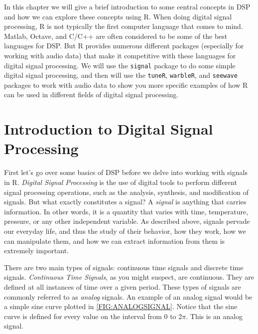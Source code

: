 \documentclass[12pt,oneside]{book}\usepackage[]{graphicx}\usepackage[]{color}
\begin{document}
{{{{In this chapter we will give a brief introduction to some central concepts in DSP and how we can explore these concepts using R. When doing digital signal processing, R is not typically the first computer language that comes to mind. Matlab, Octave, and C/C++ are often considered to be some of the best languages for DSP. But R provides numerous different packages (especially for working with audio data) that make it competitive with these languages for digital signal processing. We will use the \verb+signal+ package to do some simple digital signal processing, and then will use the \verb+tuneR+, \verb+warbleR+, and \verb+seewave+ packages to work with audio data to show you more specific examples of how R can be used in different fields of digital signal processing. 

\section{Introduction to Digital Signal Processing}

First let's go over some basics of DSP before we delve into working with signals in R. \emph{Digital Signal Processing} is the use of digital tools to perform different signal processing operations, such as the analysis, synthesis, and modification of signals. But what exactly constitutes a signal? A \emph{signal} is anything that carries information. In other words, it is a quantity that varies with time, temperature, pressure, or any other independent variable. As described above, signals pervade our everyday life, and thus the study of their behavior, how they work, how we can manipulate them, and how we can extract information from them is extremely important. 

There are two main types of signals: continuous time signals and discrete time signals. \emph{Continuous Time Signals}, as you might suspect, are continuous. They are defined at all instances of time over a given period. These types of signals are commonly referred to as \emph{analog} signals. An example of an analog signal would be a simple sine curve plotted in \ref{FIG:ANALOGSIGNAL}. Notice that the sine curve is defined for every value on the interval from 0 to 2$\pi$. This is an analog signal. 

}}}}
\end{document}
